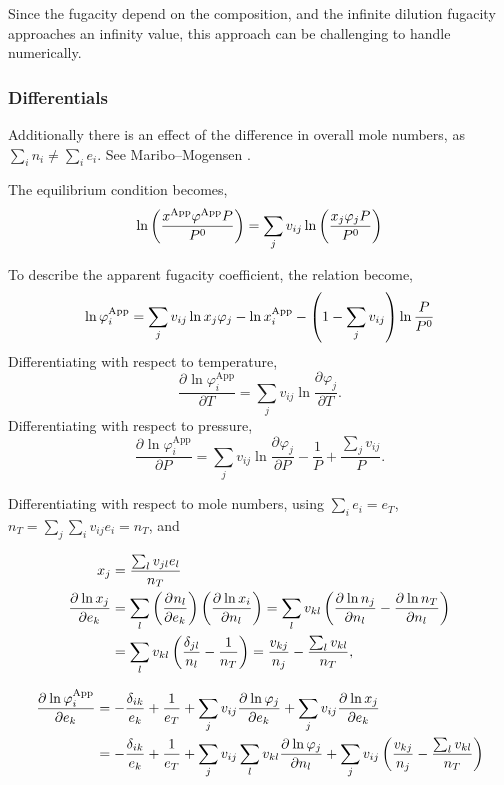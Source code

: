 \documentclass[english]{../thermomemo/thermomemo}
\newcommand*{\pd}[3][]{\frac{\partial^{#1}#2}{\partial{#3}^{#1}}}%
\newcommand{\lp}{\ensuremath{\left(}\xspace}
\newcommand{\rp}{\ensuremath{\right)}\xspace}
\newcommand{\app}{\ensuremath{\text{App}}\xspace}
\begin{document}
Since the fugacity depend on the composition, and the infinite
dilution fugacity approaches an infinity value, this approach can be
challenging to handle numerically.

\subsubsection{Differentials}
Additionally there is an effect of the difference in overall mole
numbers, as $\sum_i n_i \neq \sum_i e_i$. See Maribo--Mogensen
\cite[App. C.3]{Mogensen2014}.

The equilibrium condition becomes,
\begin{equation}
  \ln \lp \frac{x^\app \varphi^\app P}{P^0} \rp  = \sum_j v_{ij} \ln \lp \frac{x_j \varphi_j P}{P^0} \rp
\label{eq:fugacity}
\end{equation}

To describe the apparent fugacity coefficient, the relation become,
\begin{equation}
  \ln \varphi^\app_i  = \sum_j v_{ij} \ln x_j \varphi_j - \ln x_i^\app - \lp 1 - \sum_j v_{ij} \rp \ln \frac{P}{P^0}
\label{eq:fugacity_coeff_app}
\end{equation}
Differentiating with respect to temperature,
\begin{equation}
  \pd{\ln \varphi^\app_i}{T}  = \sum_j v_{ij} \ln \pd{\varphi_j}{T}.
\label{eq:fugacity_coeff_app_T}
\end{equation}
Differentiating with respect to pressure,
\begin{equation}
  \pd{\ln \varphi^\app_i}{P}  = \sum_j v_{ij} \ln \pd{\varphi_j}{P} - \frac{1}{P} + \frac{\sum_j v_{ij}}{P}.
\label{eq:fugacity_coeff_app_P}
\end{equation}

Differentiating with respect to mole numbers, using $\sum_i e_i = e_T$,
$n_T = \sum_j \sum_i v_{ij} e_i = n_T$, and

\begin{align}
  x_j  &= \frac{\sum_l v_{jl} e_l}{n_T}\\
  \pd{\ln x_j}{e_k} &= \sum_l \lp\pd{n_l}{e_k}\rp \lp \pd{\ln x_i}{n_l} \rp = \sum_l v_{kl} \lp \pd{\ln n_j}{n_l} -\pd{\ln n_T}{n_l} \rp \nonumber \\
  &= \sum_l v_{kl} \lp \frac{\delta_{jl}}{n_l} - \frac{1}{n_T} \rp = \frac{v_{kj}}{n_j} - \frac{\sum_l v_{kl}}{n_T},
\label{eq:x_ion}
\end{align}

\begin{align}
  \pd{\ln \varphi^\app_i}{e_k}  &= - \frac{\delta_{ik}}{e_k} + \frac{1}{e_T} + \sum_j v_{ij} \pd{\ln \varphi_j}{e_k} + \sum_j v_{ij} \pd{\ln x_j}{e_k} \nonumber \\
  &= - \frac{\delta_{ik}}{e_k} + \frac{1}{e_T} + \sum_j v_{ij} \sum_l v_{kl} \pd{\ln \varphi_j}{n_l} + \sum_j v_{ij} \lp \frac{v_{kj}}{n_j} - \frac{\sum_l v_{kl}}{n_T} \rp
\label{eq:fugacity_coeff_app_n}
\end{align}
\end{document}
